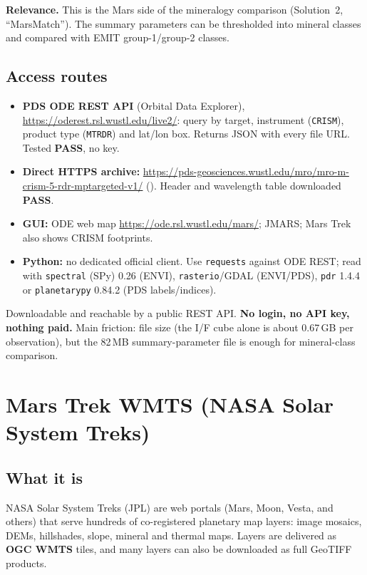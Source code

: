 \documentclass[10pt,a4paper]{article}
\newcommand{\OK}{\textcolor{ok}{\textbf{PASS}}}
\begin{document}
\textbf{Relevance.} This is the Mars side of the mineralogy comparison (Solution~2, ``MarsMatch''). The summary parameters can be thresholded into mineral classes and compared with EMIT group-1/group-2 classes.

\subsection{Access routes}
\begin{itemize}
\item \textbf{PDS ODE REST API} (Orbital Data Explorer), \url{https://oderest.rsl.wustl.edu/live2/}: query by target, instrument (\texttt{CRISM}), product type (\texttt{MTRDR}) and lat/lon box. Returns JSON with every file URL. Tested \OK{}, no key.
\item \textbf{Direct HTTPS archive:} \url{https://pds-geosciences.wustl.edu/mro/mro-m-crism-5-rdr-mptargeted-v1/} (). Header and wavelength table downloaded \OK{}.
\item \textbf{GUI:} ODE web map \url{https://ode.rsl.wustl.edu/mars/}; JMARS; Mars Trek also shows CRISM footprints.
\item \textbf{Python:} no dedicated official client. Use \texttt{requests} against ODE REST; read with \texttt{spectral} (SPy) 0.26 (ENVI), \texttt{rasterio}/GDAL (ENVI/PDS), \texttt{pdr} 1.4.4 or \texttt{planetarypy} 0.84.2 (PDS labels/indices).
\end{itemize}
\begin{verdict}
Downloadable and reachable by a public REST API. \textbf{No login, no API key, nothing paid.} Main friction: file size (the I/F cube alone is about 0.67\,GB per observation), but the 82\,MB summary-parameter file is enough for mineral-class comparison.
\end{verdict}

\section{Mars Trek WMTS (NASA Solar System Treks)}
\subsection{What it is}
NASA Solar System Treks (JPL) are web portals (Mars, Moon, Vesta, and others) that serve hundreds of co-registered planetary map layers: image mosaics, DEMs, hillshades, slope, mineral and thermal maps. Layers are delivered as \textbf{OGC WMTS} tiles, and many layers can also be downloaded as full GeoTIFF products.
\end{document}
